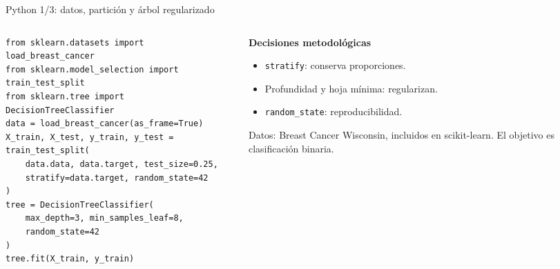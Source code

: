 \documentclass[aspectratio=169,11pt,table]{beamer}
\begin{document}
\begin{frame}[fragile]{Python 1/3: datos, partición y árbol regularizado}
\scriptsize
\begin{columns}[T,onlytextwidth]
\begin{column}{0.62\textwidth}
\begin{lstlisting}[style=ccdepython]
from sklearn.datasets import load_breast_cancer
from sklearn.model_selection import train_test_split
from sklearn.tree import DecisionTreeClassifier
data = load_breast_cancer(as_frame=True)
X_train, X_test, y_train, y_test = train_test_split(
    data.data, data.target, test_size=0.25,
    stratify=data.target, random_state=42
)
tree = DecisionTreeClassifier(
    max_depth=3, min_samples_leaf=8,
    random_state=42
)
tree.fit(X_train, y_train)
\end{lstlisting}
\end{column}
\begin{column}{0.34\textwidth}
\begin{keybox}
\textbf{Decisiones metodológicas}
\begin{itemize}
  \item \texttt{stratify}: conserva proporciones.
  \item Profundidad y hoja mínima: regularizan.
  \item \texttt{random\_state}: reproducibilidad.
\end{itemize}
\end{keybox}
\vspace{0cm}
\begin{ccdebox}
\scriptsize
Datos: Breast Cancer Wisconsin, incluidos en scikit-learn. El objetivo es clasificación binaria.
\end{ccdebox}
\end{column}
\end{columns}
\end{frame}
\end{document}
